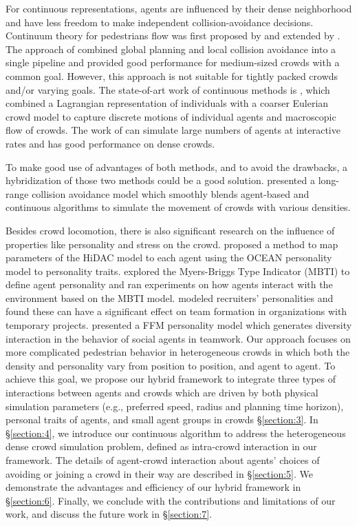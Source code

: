 \documentclass[conference]{acmsiggraph}
\begin{document}
For continuous representations, agents are influenced by their dense neighborhood and have less freedom to make independent collision-avoidance decisions. Continuum theory for pedestrians flow was first proposed by \cite{Hughes:2003} and extended by \cite{Treuille:2006}. The approach of \cite{Treuille:2006} combined global planning and local collision avoidance into a single pipeline and provided good performance for medium-sized crowds with a common goal. However, this approach is not suitable for tightly packed crowds and/or varying goals. The state-of-art work of continuous methods is \cite{Narain:2009}, which combined a Lagrangian representation of individuals with a coarser Eulerian crowd model to capture discrete motions of individual agents and macroscopic flow of crowds. The work of \cite{Narain:2009} can simulate large numbers of agents at interactive rates and has good performance on dense crowds. 

To make good use of advantages of both methods, and to avoid the drawbacks, a hybridization of those two methods could be a good solution. \cite{Golas:2013} presented a long-range collision avoidance model which smoothly blends agent-based and continuous algorithms to simulate the movement of crowds with various densities. 

Besides crowd locomotion, there is also significant research on the influence of properties like personality and stress on the crowd. \cite{Durupinar:2008} proposed a method to map parameters of the HiDAC model to each agent using the OCEAN personality model to personality traits. \cite{Salvit:2011} explored the Myers-Briggs Type Indicator (MBTI) to define agent personality and ran experiments on how agents interact with the environment based on the MBTI model. \cite{Farhangian:2011} modeled recruiters’ personalities and found these can have a significant effect on team formation in organizations with temporary projects. \cite{Prada:2009} presented a FFM personality model which generates diversity interaction in the behavior of social agents in teamwork. 
Our approach focuses on more complicated pedestrian behavior in heterogeneous crowds in which both the density and personality vary from position to position, and agent to agent. To achieve this goal, we propose our hybrid framework to integrate three types of interactions between agents and crowds which are driven by both physical simulation parameters (e.g., preferred speed, radius and planning time horizon), personal traits of agents, and small agent groups in crowds \S\ref{section:3}. In \S\ref{section:4}, we introduce our continuous algorithm to address the heterogeneous dense crowd simulation problem, defined as intra-crowd interaction in our framework. The details of agent-crowd interaction about agents’ choices of avoiding or joining a crowd in their way are described in \S\ref{section:5}. We demonstrate the advantages and efficiency of our hybrid framework in \S\ref{section:6}. Finally, we conclude with the contributions and limitations of our work, and discuss the future work in \S\ref{section:7}.
\end{document}
